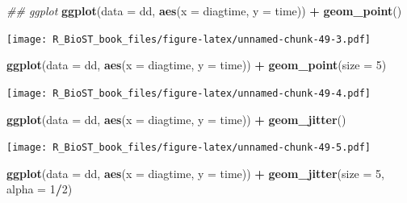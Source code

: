 \documentclass[
]{book}
\newenvironment{Shaded}{\begin{snugshade}}{\end{snugshade}}
\newcommand{\CommentTok}[1]{\textcolor[rgb]{0.56,0.35,0.01}{\textit{#1}}}
\newcommand{\DataTypeTok}[1]{\textcolor[rgb]{0.13,0.29,0.53}{#1}}
\newcommand{\DecValTok}[1]{\textcolor[rgb]{0.00,0.00,0.81}{#1}}
\newcommand{\KeywordTok}[1]{\textcolor[rgb]{0.13,0.29,0.53}{\textbf{#1}}}
\newcommand{\NormalTok}[1]{#1}
\newcommand{\OperatorTok}[1]{\textcolor[rgb]{0.81,0.36,0.00}{\textbf{#1}}}
\newcommand{\StringTok}[1]{\textcolor[rgb]{0.31,0.60,0.02}{#1}}
\begin{document}
\begin{Shaded}
\begin{Highlighting}[]
\CommentTok{\#\# ggplot}
\KeywordTok{ggplot}\NormalTok{(}\DataTypeTok{data =}\NormalTok{ dd, }\KeywordTok{aes}\NormalTok{(}\DataTypeTok{x =}\NormalTok{ diagtime, }\DataTypeTok{y =}\NormalTok{ time)) }\OperatorTok{+}\StringTok{ }
\StringTok{  }\KeywordTok{geom\_point}\NormalTok{()}
\end{Highlighting}
\end{Shaded}

\texttt{[image: R\_BioST\_book\_files/figure-latex/unnamed-chunk-49-3.pdf]}

\begin{Shaded}
\begin{Highlighting}[]
\KeywordTok{ggplot}\NormalTok{(}\DataTypeTok{data =}\NormalTok{ dd, }\KeywordTok{aes}\NormalTok{(}\DataTypeTok{x =}\NormalTok{ diagtime, }\DataTypeTok{y =}\NormalTok{ time)) }\OperatorTok{+}\StringTok{ }
\StringTok{  }\KeywordTok{geom\_point}\NormalTok{(}\DataTypeTok{size =} \DecValTok{5}\NormalTok{)}
\end{Highlighting}
\end{Shaded}

\texttt{[image: R\_BioST\_book\_files/figure-latex/unnamed-chunk-49-4.pdf]}

\begin{Shaded}
\begin{Highlighting}[]
\KeywordTok{ggplot}\NormalTok{(}\DataTypeTok{data =}\NormalTok{ dd, }\KeywordTok{aes}\NormalTok{(}\DataTypeTok{x =}\NormalTok{ diagtime, }\DataTypeTok{y =}\NormalTok{ time)) }\OperatorTok{+}\StringTok{ }
\StringTok{  }\KeywordTok{geom\_jitter}\NormalTok{() }
\end{Highlighting}
\end{Shaded}

\texttt{[image: R\_BioST\_book\_files/figure-latex/unnamed-chunk-49-5.pdf]}

\begin{Shaded}
\begin{Highlighting}[]
\KeywordTok{ggplot}\NormalTok{(}\DataTypeTok{data =}\NormalTok{ dd, }\KeywordTok{aes}\NormalTok{(}\DataTypeTok{x =}\NormalTok{ diagtime, }\DataTypeTok{y =}\NormalTok{ time)) }\OperatorTok{+}\StringTok{ }
\StringTok{  }\KeywordTok{geom\_jitter}\NormalTok{(}\DataTypeTok{size =} \DecValTok{5}\NormalTok{, }\DataTypeTok{alpha =} \DecValTok{1}\OperatorTok{/}\DecValTok{2}\NormalTok{) }
\end{Highlighting}
\end{Shaded}
\end{document}
